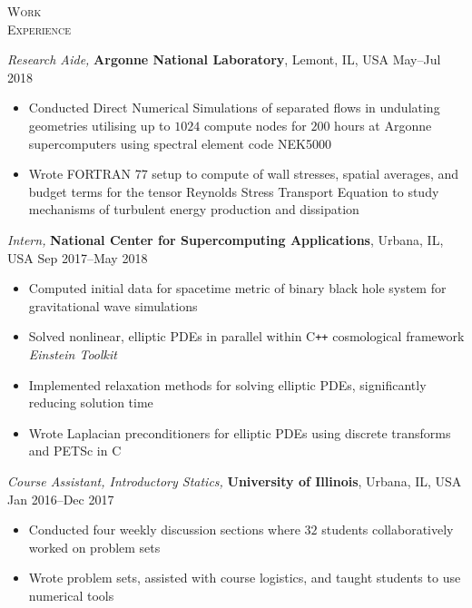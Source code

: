 \documentclass[10pt]{article}
\begin{document}
\begin{multicols}{2}
\textsc{\small Work \\ Experience}
\columnbreak

{\sl Research Aide,} \textbf{Argonne National Laboratory}, Lemont, IL, USA \hfill May--Jul 2018

\vspace{-1.75em}
\begin{itemize}[label=-]
    \setlength\itemsep{-0.25em}
    \item Conducted Direct Numerical Simulations of separated flows in undulating geometries utilising up to $1024$ compute nodes for $200$ hours at Argonne supercomputers using spectral element code NEK5000
    \item Wrote FORTRAN 77 setup to compute of wall stresses, spatial averages, and budget terms for the tensor Reynolds Stress Transport Equation to study mechanisms of turbulent energy production and dissipation
\end{itemize}
\vspace{-2.0em}

\vspace{0.5em}
%
{\sl Intern,} \textbf{National Center for Supercomputing Applications}, Urbana, IL, USA \hfill Sep 2017--May 2018

\vspace{-1.75em}
\begin{itemize}[label=-]
    \setlength\itemsep{-0.25em}
    \item Computed initial data for spacetime metric of binary black hole system for gravitational wave simulations
    \item Solved nonlinear, elliptic PDEs in parallel within C\texttt{++} cosmological framework \textit{Einstein Toolkit}
    \item Implemented relaxation methods for solving elliptic PDEs, significantly reducing solution time
    \item Wrote Laplacian preconditioners for elliptic PDEs using discrete transforms and PETSc in C
\end{itemize}
\vspace{-2.0em}

\vspace{0.5em}
%
{\sl Course Assistant, Introductory Statics,} \textbf{University of Illinois}, Urbana, IL, USA \hfill Jan 2016--Dec 2017

\vspace{-1.75em}
\begin{itemize}[label=-]
    \setlength\itemsep{-0.25em}
    \item Conducted four weekly discussion sections where $32$ students collaboratively worked on problem sets
    \item Wrote problem sets, assisted with course logistics, and taught students to use numerical tools
\end{itemize}
\vspace{-2.0em}

\end{multicols}
\end{document}
